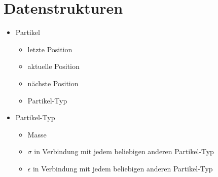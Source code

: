 \documentclass{article}
\begin{document}
\section*{Datenstrukturen}
\begin{itemize}
	\item Partikel
	\begin{itemize}
		\item letzte     Position
		\item aktuelle Position
		\item nächste Position
		\item Partikel-Typ
	\end{itemize}
	\item Partikel-Typ
	\begin{itemize}
		\item Masse
		\item $\sigma$ in Verbindung mit jedem beliebigen anderen Partikel-Typ
		\item $\epsilon$ in Verbindung mit jedem beliebigen anderen Partikel-Typ
	\end{itemize}
\end{itemize}
\end{document}
